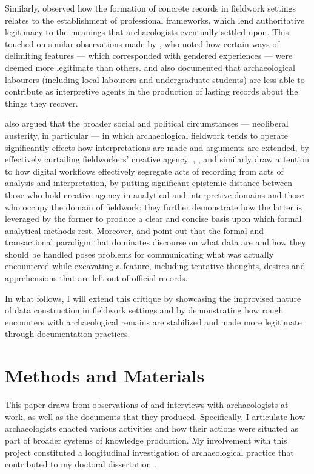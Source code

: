 \documentclass{article}
\begin{document}
Similarly, \textcites{goodwin1994}{goodwin2010} observed how the
formation of concrete records in fieldwork settings relates to the
establishment of professional frameworks, which lend authoritative
legitimacy to the meanings that archaeologists eventually settled upon.
This touched on similar observations made by \textcite{gero1996}, who
noted how certain ways of delimiting features --- which corresponded
with gendered experiences --- were deemed more legitimate than others.
\textcite{mickel2021} and \textcite{yarrow2008} also documented that
archaeological labourers (including local labourers and undergraduate
students) are less able to contribute as interpretive agents in the
production of lasting records about the things they recover.

\textcite{thorpe2012} also argued that the broader social and political
circumstances --- neoliberal austerity, in particular --- in which
archaeological fieldwork tends to operate significantly effects how
interpretations are made and arguments are extended, by effectively
curtailing fieldworkers' creative agency. \textcite{huggett2022},
\textcite{caraher2019}, \textcite{batist2021} and
\textcite{batist-alienation} similarly draw attention to how digital
workflows effectively segregate acts of recording from acts of analysis
and interpretation, by putting significant epistemic distance between
those who hold creative agency in analytical and interpretive domains
and those who occupy the domain of fieldwork; they further demonstrate
how the latter is leveraged by the former to produce a clear and concise
basis upon which formal analytical methods rest. Moreover,
\textcite{batist2024a} and \textcite{haciguzeller2021} point out that
the formal and transactional paradigm that dominates discourse on what
data are and how they should be handled poses problems for communicating
what was actually encountered while excavating a feature, including
tentative thoughts, desires and apprehensions that are left out of
official records.

In what follows, I will extend this critique by showcasing the
improvised nature of data construction in fieldwork settings and by
demonstrating how rough encounters with archaeological remains are
stabilized and made more legitimate through documentation practices.



\section{Methods and Materials}
This paper draws from observations of and interviews with archaeologists
at work, as well as the documents that they produced. Specifically, I
articulate how archaeologists enacted various activities and how their
actions were situated as part of broader systems of knowledge
production. My involvement with this project constituted a longitudinal
investigation of archaeological practice that contributed to my doctoral
dissertation \parencite[see][]{batist2023a}.
\end{document}

